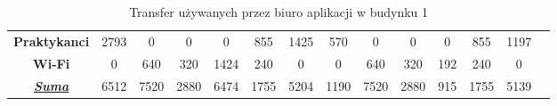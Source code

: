 \documentclass[a4paper, 12pt]{article}
\begin{document}
\begin{itemize}
\begin{table}[H]
{\begin{tabular}{c|c|c|c|c|c|c|c|c|c|c|c|c|l}
\multicolumn{1}{|c|}{\textbf{Praktykanci}}         & 2793                  & 0                         & 0             & 0                   & 855                  & 1425                       & 570                   & 0                         & 0             & 0                   & 855                  & 1197                     &  \\ \cline{1-13}
\multicolumn{1}{|c|}{\textbf{Wi-Fi}}               & 0                     & 640                       & 320           & 1424                & 240                  & 0                          & 0                     & 640                       & 320           & 192                 & 240                  & 0                        &  \\ \cline{1-13}
\multicolumn{1}{|c|}{{\ul \textit{\textbf{Suma}}}} & 6512                  & 7520                      & 2880          & 6474                & 1755                 & 5204                       & 1190                  & 7520                      & 2880          & 915                 & 1755                 & 5139                     &  \\ \cline{1-13}
\end{tabular}}
\caption{Transfer używanych przez biuro aplikacji w budynku 1} 
\end{table}


\end{itemize}
\end{document}
